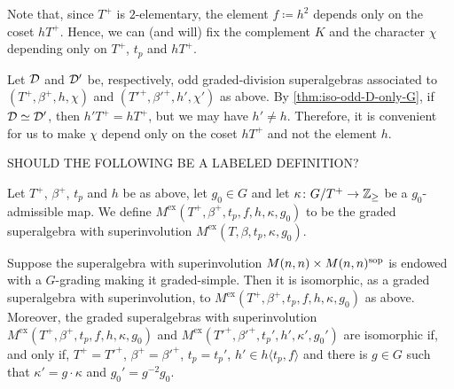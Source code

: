 Note that, since $T^+$ is $2$-elementary, the element $f \coloneqq h^2$ depends only on the coset $hT^+$. 
Hence, we can (and will) fix the complement $K$ and the character $\chi$ depending only on $T^+$, $t_p$ and $hT^+$. 

\begin{remark}
    Let $\mathcal{D}$ and $\mathcal{D}'$ be, respectively, odd graded-division superalgebras associated to $(T^+, \beta^+, h,\chi)$ and $(T'^+, \beta'^+, h',\chi')$ as above. 
    By \cref{thm:iso-odd-D-only-G}, if $\mathcal{D} \simeq \mathcal{D}'$, then $h'T^+ = hT^+$, but we may have $h' \neq h$. 
    Therefore, it is convenient for us to make $\chi$ depend only on the coset $hT^+$ and not the element $h$. 
\end{remark}

%


SHOULD THE FOLLOWING BE A LABELED DEFINITION?

\begin{defi}
    Let $T^+$, $\beta^+$, $t_p$ and $h$ be as above, let $g_0 \in G$ and let $\kappa\colon G/T^+ \to \mathbb{Z}_{\geq}$ be a $g_0$-admissible map. 
    We define $M^{\mathrm{ex}}(T^+, \beta^+, t_p, f, h, \kappa, g_0)$ to be the graded superalgebra with superinvolution $M^{\mathrm{ex}}(T, \beta, t_p, \kappa, g_0)$. 
\end{defi}

\begin{cor}\label{cor:MxMsop-odd-only-G}
    Suppose the superalgebra with superinvolution $M(n,n) \times M(n,n)^{\mathrm{sop}}$ is endowed with a $G$-grading making it graded-simple. 
    Then it is isomorphic, as a graded superalgebra with superinvolution, to $M^{\mathrm{ex}}(T^+, \beta^+, t_p, f, h, \kappa, g_0)$ as above. 
    Moreover, the graded superalgebras with superinvolution $M^{\mathrm{ex}}(T^+, \beta^+, t_p, f, h, \kappa, g_0)$ and $M^{\mathrm{ex}} (T'^+, \beta'^+, t_p',  h', \kappa', g_0')$ are isomorphic if, and only if, $T^+ =T'^+$, $\beta^+ = \beta'^+$, $t_p = t_p'$, $h' \in h \langle t_p, f \rangle$ and there is $g \in G$ such that $\kappa' = g\cdot\kappa$ and $g_0' = g^{-2}g_0$. 
\end{cor}

